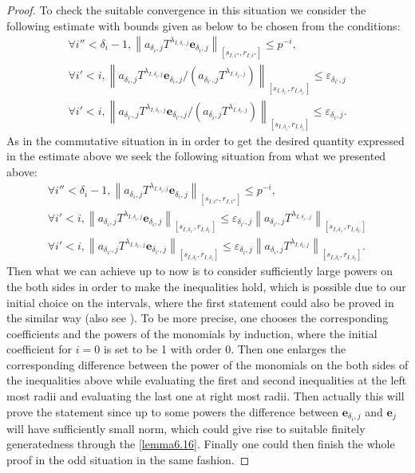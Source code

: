 \documentclass[12pt]{amsart}
\theoremstyle{definition}
\numberwithin{equation}{section}
\begin{document}
\begin{proof}
To check the suitable convergence in this situation we consider the following estimate with bounds given as below to be chosen from the conditions:
\begin{align}
\forall i''<\delta_i-1, \left\|a_{\delta_i,j}T^{\lambda_{I,\delta_i,j}}\mathbf{e}_{\delta_i,j}\right\|_{[s_{I,i''},r_{I,i''}]}\leq p^{-i},\\
\forall i'<i, \left\|a_{\delta_i,j}T^{\lambda_{I,\delta_i,j}}\mathbf{e}_{\delta_i,j}/(a_{\delta_{i'},j}T^{\lambda_{I,\delta_{i'},j}})\right\|_{[s_{I,\delta_{i'}},r_{I,\delta_{i'}}]} \leq \varepsilon_{\delta_{i'},j}\\
\forall i'<i, \left\|a_{\delta_{i'},j}T^{\lambda_{I,\delta_{i'},j}}\mathbf{e}_{\delta_{i'},j}/(a_{\delta_i,j}T^{\lambda_{I,\delta_i,j}})\right\|_{[s_{I,\delta_{i}},r_{I,\delta_{i}}]} \leq \varepsilon_{\delta_i,j}.	
\end{align}
As in the commutative situation in \cite[Proposition 2.1.13]{KPX} in order to get the desired quantity expressed in the estimate above we seek the following situation from what we presented above:
\begin{align}
\forall i''<\delta_i-1, \left\|a_{\delta_i,j}T^{\lambda_{I,\delta_i,j}}\mathbf{e}_{\delta_i,j}\right\|_{[s_{I,i''},r_{I,i''}]}\leq p^{-i},\\
\forall i'<i, \left\|a_{\delta_i,j}T^{\lambda_{I,\delta_i,j}}\mathbf{e}_{\delta_i,j}\right\|_{[s_{I,\delta_{i'}},r_{I,\delta_{i'}}]} \leq \varepsilon_{\delta_{i'},j} \left\|a_{\delta_{i'},j}T^{\lambda_{I,\delta_{i'},j}}\right\|_{[s_{I,\delta_{i'}},r_{I,\delta_{i'}}]}\\
\forall i'<i, \left\|a_{\delta_{i'},j}T^{\lambda_{I,\delta_{i'},j}}\mathbf{e}_{\delta_{i'},j}\right\|_{[s_{I,\delta_i},r_{I,\delta_i}]} \leq \varepsilon_{\delta_i,j} \left\|a_{\delta_i,j}T^{\lambda_{I,\delta_i,j}}\right\|_{[s_{I,\delta_i},r_{I,\delta_i}]}.	
\end{align} 	
Then what we can achieve up to now is to consider sufficiently large powers on the both sides in order to make the inequalities hold, which is possible due to our initial choice on the intervals, where the first statement could also be proved in the similar way (also see \cite[Proposition 2.1.13]{KPX}). To be more precise, one chooses the corresponding coefficients and the powers of the monomials by induction, where the initial coefficient for $i=0$ is set to be 1 with order 0. Then one enlarges the corresponding difference between the power of the monomials on the both sides of the inequalities above while evaluating the first and second inequalities at the left most radii and evaluating the last one at right most radii. Then actually this will prove the statement since up to some powers the difference between $\mathbf{e}_{\delta_i,j}$ and $\mathbf{e}_j$ will have sufficiently small norm, which could give rise to suitable finitely generatedness through the \cref{lemma6.16}. Finally one could then finish the whole proof in the odd situation in the same fashion.

\end{proof}
\end{document}
